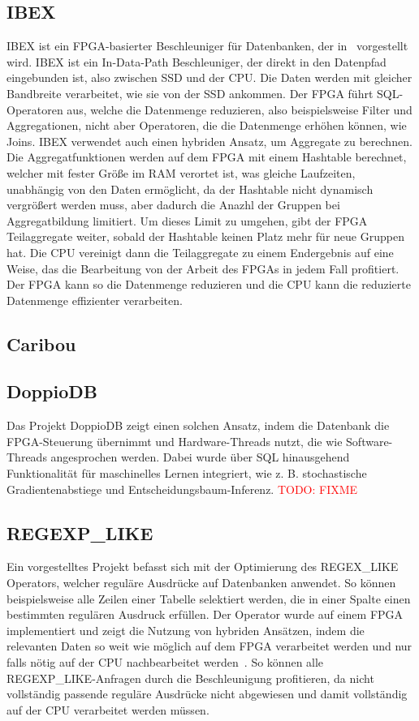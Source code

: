 \documentclass[conference]{IEEEtran}
\newcommand{\todo}[1]{\textcolor{red}{TODO: #1}}
\begin{document}
\subsection{IBEX}
IBEX ist ein FPGA-basierter Beschleuniger für Datenbanken, der in~\cite{istvan_glass_2019} vorgestellt wird. IBEX ist ein In-Data-Path Beschleuniger,
der direkt in den Datenpfad eingebunden ist, also zwischen SSD und der CPU. Die Daten werden mit gleicher Bandbreite verarbeitet, wie sie von der SSD
ankommen. Der FPGA führt SQL-Operatoren aus, welche die Datenmenge reduzieren, also beispielsweise Filter und Aggregationen, nicht aber Operatoren,
die die Datenmenge erhöhen können, wie Joins. IBEX verwendet auch einen hybriden Ansatz, um Aggregate zu berechnen. Die Aggregatfunktionen werden auf dem FPGA
mit einem Hashtable berechnet, welcher mit fester Größe im RAM verortet ist, was gleiche Laufzeiten, unabhängig von den Daten ermöglicht, da der Hashtable nicht
dynamisch vergrößert werden muss, aber dadurch die Anazhl der Gruppen bei Aggregatbildung limitiert. Um dieses Limit zu umgehen, gibt der FPGA Teilaggregate
weiter, sobald der Hashtable keinen Platz mehr für neue Gruppen hat. Die CPU vereinigt dann die Teilaggregate zu einem Endergebnis auf eine Weise, das die Bearbeitung
von der Arbeit des FPGAs in jedem Fall profitiert. Der FPGA kann so die Datenmenge reduzieren und die CPU kann die reduzierte Datenmenge effizienter verarbeiten.

\subsection{Caribou}

\subsection{DoppioDB}
Das Projekt DoppioDB zeigt einen solchen Ansatz, indem die Datenbank die FPGA-Steuerung
übernimmt und Hardware-Threads nutzt, die wie Software-Threads angesprochen werden. Dabei wurde über SQL hinausgehend Funktionalität für maschinelles Lernen integriert, wie z. B.
stochastische Gradientenabstiege und Entscheidungsbaum-Inferenz.
\todo{FIXME}

\subsection{REGEXP\_LIKE}
Ein vorgestelltes Projekt befasst sich mit der Optimierung des REGEX\_LIKE Operators, welcher reguläre Ausdrücke auf Datenbanken anwendet. So können beispielsweise
alle Zeilen einer Tabelle selektiert werden, die in einer Spalte einen bestimmten regulären Ausdruck erfüllen. Der Operator wurde auf einem FPGA implementiert
und zeigt die Nutzung von hybriden Ansätzen, indem die relevanten Daten so weit wie möglich auf dem FPGA verarbeitet werden und nur falls nötig auf der CPU
nachbearbeitet werden~\cite{sidler_accelerating_2017}. So können alle REGEXP\_LIKE-Anfragen durch die Beschleunigung profitieren, da nicht vollständig passende
reguläre Ausdrücke nicht abgewiesen und damit vollständig auf der CPU verarbeitet werden müssen.
\end{document}
